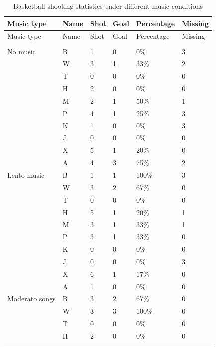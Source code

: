 \documentclass[man,floatsintext]{apa7}
\begin{document}
\begin{longtable}{@{}llllll@{}}
 \toprule
    Music type & Name & Shot & Goal & Percentage & Missing \\
    \endfirsthead
    \toprule
    Music type & Name & Shot & Goal & Percentage & Missing \\
    \endhead
    \midrule
    \endfoot
    \bottomrule
    \caption{Basketball shooting statistics under different music conditions}
    \label{basketballtable} \\
 
    \endlastfoot
        \midrule
        No music & B & 1 & 0 & 0\% & 3 \\
                 & W & 3 & 1 & 33\% & 2 \\
                 & T & 0 & 0 & 0\% & 0 \\
                 & H & 2 & 0 & 0\% & 0 \\
                 & M & 2 & 1 & 50\% & 1 \\
                 & P & 4 & 1 & 25\% & 3 \\
                 & K & 1 & 0 & 0\% & 3 \\
                 & J & 0 & 0 & 0\% & 0 \\
                 & X & 5 & 1 & 20\% & 0 \\
                 & A & 4 & 3 & 75\% & 2 \\
        \midrule
        Lento music & B & 1 & 1 & 100\% & 3 \\
                    & W & 3 & 2 & 67\% & 0 \\
                    & T & 0 & 0 & 0\% & 0 \\
                    & H & 5 & 1 & 20\% & 1 \\
                    & M & 3 & 1 & 33\% & 1 \\
                    & P & 3 & 1 & 33\% & 0 \\
                    & K & 0 & 0 & 0\% & 0 \\
                    & J & 0 & 0 & 0\% & 3 \\
                    & X & 6 & 1 & 17\% & 0 \\
                    & A & 1 & 0 & 0\% & 0 \\
        \midrule
        Moderato songs & B & 3 & 2 & 67\% & 0 \\
                       & W & 3 & 3 & 100\% & 0 \\
                       & T & 0 & 0 & 0\% & 0 \\
                       & H & 2 & 0 & 0\% & 0 \\

\end{longtable}
\end{document}
